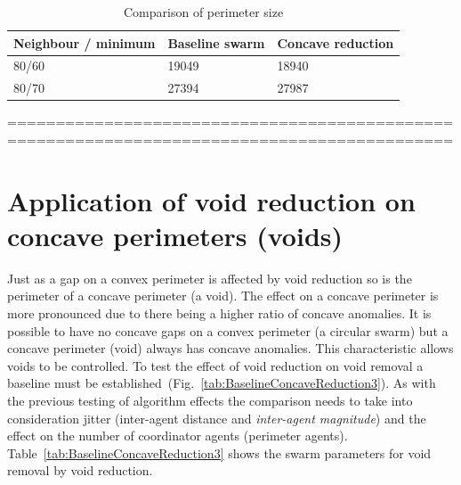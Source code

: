 \documentclass[preprint,12pt]{elsarticle}
\begin{document}
\begin{table}
\caption{Comparison of perimeter size} 
\label{tab:BaselineConcaveComparison}
\begin{center}
\begin{tabular}{| p{2.3cm} | p{2cm} | p{2cm} |}
\hline
\bf Neighbour / minimum & \bf Baseline \bf swarm & \bf Concave \bf reduction \\ \hline
80/60 & 19049 & 18940 \\  \hline
80/70 & 27394 & 27987 \\  \hline
\end{tabular}
\end{center}
\end{table}

============================================================================================

\section{Application of void reduction on concave perimeters (voids)}\label{sec:ApplicationConcavePerimeters}
Just as a gap on a convex perimeter is affected by void reduction so is the perimeter of a concave perimeter (a void). The effect on a concave perimeter is more pronounced due to there being a higher ratio of concave anomalies. It is possible to have no concave gaps on a convex perimeter (a circular swarm) but a concave perimeter (void) always has concave anomalies. This characteristic allows voids to be controlled. To test the effect of void reduction on void removal a baseline must be established~(Fig.~\ref{tab:BaselineConcaveReduction3}).
As with the previous testing of algorithm effects the comparison needs to take into consideration jitter (inter-agent distance and \textit{inter-agent magnitude}) and the effect on the number of coordinator agents (perimeter agents). 
Table~\ref{tab:BaselineConcaveReduction3} shows the swarm parameters for void removal by void reduction.
\end{document}
